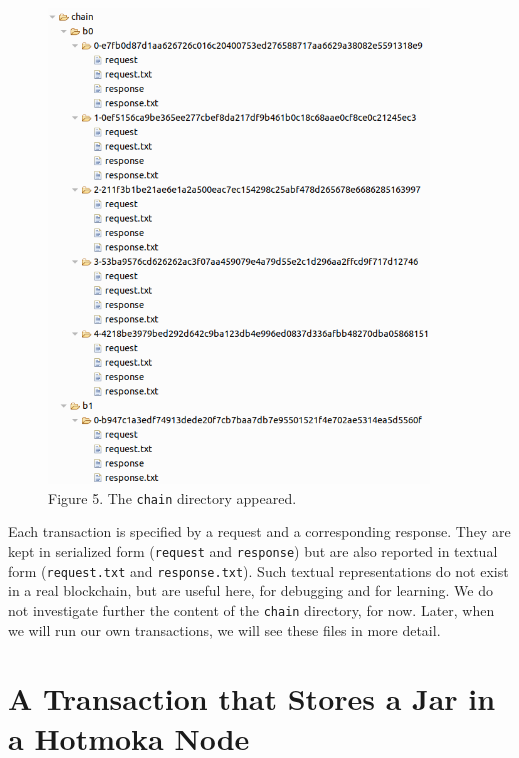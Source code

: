 \documentclass[a4paper,]{book}
\begin{document}
{\begin{figure}
\centering
\includegraphics[width=0.9\textwidth,height=\textheight]{pics/blockchain2.png}
\caption{Figure 5. The \texttt{chain} directory appeared.}
\end{figure}

Each transaction is specified by a request and a corresponding response.
They are kept in serialized form (\texttt{request} and
\texttt{response}) but are also reported in textual form
(\texttt{request.txt} and \texttt{response.txt}). Such textual
representations do not exist in a real blockchain, but are useful here,
for debugging and for learning. We do not investigate further the
content of the \texttt{chain} directory, for now. Later, when we will
run our own transactions, we will see these files in more detail.

\hypertarget{a-transaction-that-stores-a-jar-in-a-hotmoka-node}{%
\section{A Transaction that Stores a Jar in a Hotmoka Node
}\label{a-transaction-that-stores-a-jar-in-a-hotmoka-node}}

}
\end{document}
